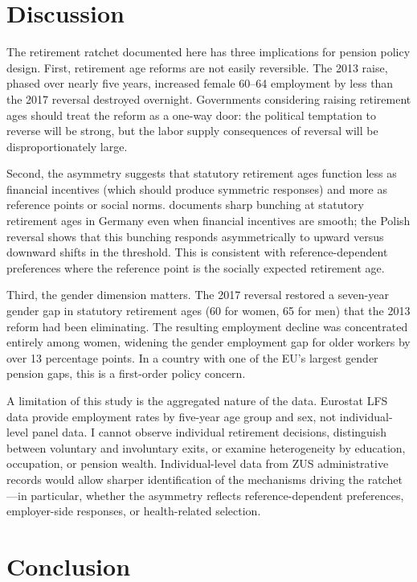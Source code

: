 \documentclass[12pt]{article}
\begin{document}



\section{Discussion}

The retirement ratchet documented here has three implications for pension policy design. First, retirement age reforms are not easily reversible. The 2013 raise, phased over nearly five years, increased female 60--64 employment by less than the 2017 reversal destroyed overnight. Governments considering raising retirement ages should treat the reform as a one-way door: the political temptation to reverse will be strong, but the labor supply consequences of reversal will be disproportionately large.

Second, the asymmetry suggests that statutory retirement ages function less as financial incentives (which should produce symmetric responses) and more as reference points or social norms. \citet{seibold2021reference} documents sharp bunching at statutory retirement ages in Germany even when financial incentives are smooth; the Polish reversal shows that this bunching responds asymmetrically to upward versus downward shifts in the threshold. This is consistent with reference-dependent preferences where the reference point is the socially expected retirement age.

Third, the gender dimension matters. The 2017 reversal restored a seven-year gender gap in statutory retirement ages (60 for women, 65 for men) that the 2013 reform had been eliminating. The resulting employment decline was concentrated entirely among women, widening the gender employment gap for older workers by over 13 percentage points. In a country with one of the EU's largest gender pension gaps, this is a first-order policy concern.

A limitation of this study is the aggregated nature of the data. Eurostat LFS data provide employment rates by five-year age group and sex, not individual-level panel data. I cannot observe individual retirement decisions, distinguish between voluntary and involuntary exits, or examine heterogeneity by education, occupation, or pension wealth. Individual-level data from ZUS administrative records would allow sharper identification of the mechanisms driving the ratchet---in particular, whether the asymmetry reflects reference-dependent preferences, employer-side responses, or health-related selection.


\section{Conclusion}
\end{document}
